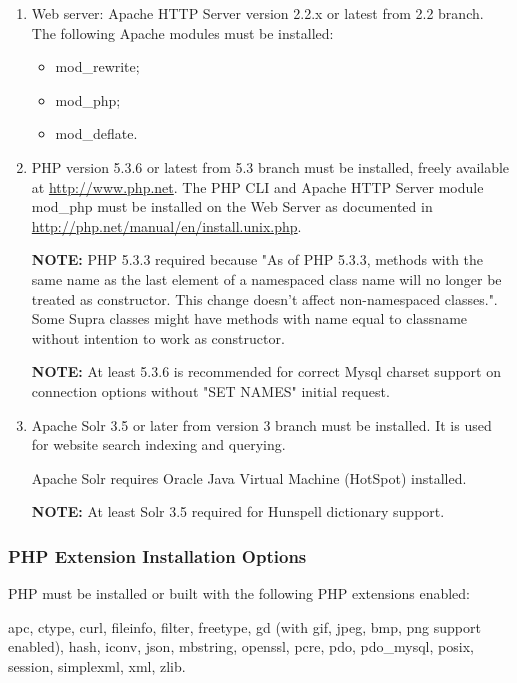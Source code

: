 \documentclass[12pt]{article}
\newcommand{\vigShowNotes}{1}
\newcommand{\note}[1]{
\textbf{NOTE:} 
#1
}
\begin{document}
\begin{enumerate}

\item 
Web server: Apache HTTP Server version 2.2.x or latest from 2.2 branch. The following Apache modules must be installed:
\begin{itemize}
	\item mod\_rewrite;
	\item mod\_php;
	\item mod\_deflate.
\end{itemize}

\item 
PHP version 5.3.6 or latest from 5.3 branch must be installed, freely available at \url{http://www.php.net}. The PHP CLI and Apache HTTP Server module \textsf{mod\_php} must be installed on the Web Server as documented in \url{http://php.net/manual/en/install.unix.php}.

\note{PHP 5.3.3 required because "As of PHP 5.3.3, methods with the same name as the last element of a namespaced class name will no longer be treated as constructor. This change doesn't affect non-namespaced classes.". Some Supra classes might have methods with name equal to classname without intention to work as constructor.}
	
\note{At least 5.3.6 is recommended for correct Mysql charset support on connection options without "SET NAMES" initial request.}

\item
Apache Solr 3.5 or later from version 3 branch must be installed. It is used for website search indexing and querying.

Apache Solr requires Oracle Java Virtual Machine (HotSpot) installed.

\note{At least Solr 3.5 required for Hunspell dictionary support.}

\end{enumerate}

\subsubsection{PHP Extension Installation Options}

PHP must be installed or built with the following PHP extensions enabled:

\textsf{apc}, \textsf{ctype}, \textsf{curl}, \textsf{fileinfo}, \textsf{filter}, \textsf{freetype}, \textsf{gd} (with gif, jpeg, bmp, png support enabled), \textsf{hash}, \textsf{iconv}, \textsf{json}, \textsf{mbstring}, \textsf{openssl}, \textsf{pcre}, \textsf{pdo}, \textsf{pdo\_mysql}, \textsf{posix}, \textsf{session}, \textsf{simplexml}, \textsf{xml}, \textsf{zlib}.
\end{document}

